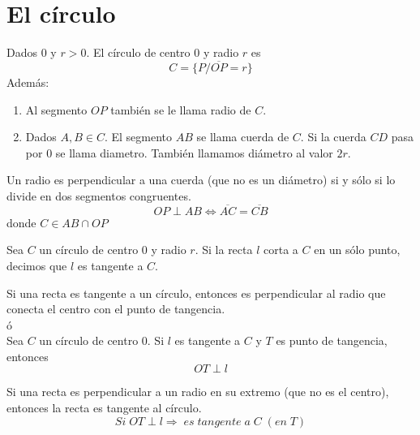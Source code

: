 \chapter{El círculo}

    \begin{def.}
	Dados $0$ y $r>0$. El círculo de centro $0$ y radio $r$ es $$C=\lbrace P/\overline{OP} = r \rbrace$$ Además:
	\begin{enumerate}[\bfseries 1)]
	    
	    \item Al segmento $OP$ también se le llama radio de $C$.

	    \item Dados $A,B \in C$. El segmento $AB$ se llama cuerda de $C$. Si la cuerda $CD$ pasa por $0$ se llama diametro. También llamamos diámetro al valor $2r$.\\

	\end{enumerate}
    \end{def.}

	\begin{proposicion}
	    Un radio es perpendicular a una cuerda (que no es un diámetro) si y sólo si lo divide en dos segmentos congruentes.
	    $$OP \perp AB \Leftrightarrow \overline{AC} = \overline{CB}$$ donde $C \in AB \cap OP$\\
	\end{proposicion}


    \begin{def.}
	Sea $C$ un círculo de centro $0$ y radio $r$. Si la recta $l$ corta a $C$ en un sólo punto, decimos que $l$ es tangente a $C$.\\
    \end{def.}

	\begin{proposicion}
	    Si una recta es tangente a un círculo, entonces es perpendicular al radio que conecta el centro con el punto de tangencia.\\	
	    ó\\
	    Sea $C$ un círculo de centro $0$. Si $l$ es tangente a $C$ y $T$ es punto de tangencia, entonces $$OT \perp l$$
	\end{proposicion}

	\begin{proposicion}
	    Si una recta es perpendicular a un radio en su extremo (que no es el centro), entonces la recta es tangente al círculo.
	    $$Si \; OT \perp l \Rightarrow \; es \; tangente \; a \; C \; (en \; T)$$
	\end{proposicion}

